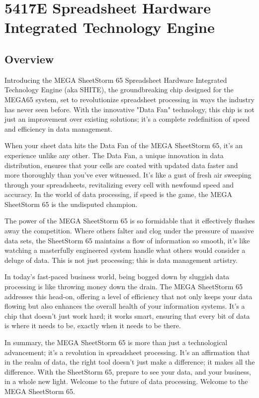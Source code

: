 \chapter{5417E Spreadsheet Hardware Integrated Technology Engine}
\label{cha:shite}

\section{Overview}

Introducing the MEGA SheetStorm 65 Spreadsheet Hardware Integrated
Technology Engine (aka SHITE), the groundbreaking chip designed
for the MEGA65 system, set to revolutionize spreadsheet processing in
ways the industry has never seen before. With the innovative "Data
Fan" technology, this chip is not just an improvement over existing
solutions; it's a complete redefinition of speed and efficiency in
data management. 

When your sheet data hits the Data Fan of the MEGA SheetStorm 65, it's
an experience unlike any other. The Data Fan, a unique innovation in
data distribution, ensures that your cells are coated with updated
data faster and more thoroughly than you've ever witnessed. It's like
a gust of fresh air sweeping through your spreadsheets, revitalizing
every cell with newfound speed and accuracy. In the world of data
processing, if speed is the game, the MEGA SheetStorm 65 is the
undisputed champion. 

The power of the MEGA SheetStorm 65 is so formidable that it
effectively flushes away the competition. Where others falter and clog
under the pressure of massive data sets, the SheetStorm 65 maintains a
flow of information so smooth, it’s like watching a masterfully
engineered system handle what others would consider a deluge of
data. This is not just processing; this is data management artistry. 

In today's fast-paced business world, being bogged down by sluggish
data processing is like throwing money down the drain. The MEGA
SheetStorm 65 addresses this head-on, offering a level of efficiency
that not only keeps your data flowing but also enhances the overall
health of your information systems. It's a chip that doesn’t just work
hard; it works smart, ensuring that every bit of data is where it
needs to be, exactly when it needs to be there. 

In summary, the MEGA SheetStorm 65 is more than just a technological
advancement; it’s a revolution in spreadsheet processing. It's an
affirmation that in the realm of data, the right tool doesn't just
make a difference; it makes all the difference. With the SheetStorm
65, prepare to see your data, and your business, in a whole new
light. Welcome to the future of data processing. Welcome to the MEGA
SheetStorm 65.

